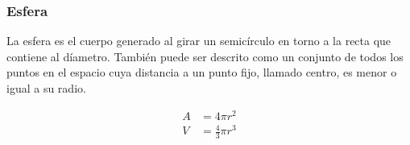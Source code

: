 \subsubsection{Esfera}
La esfera es el cuerpo generado al girar un semicírculo en torno a la recta que contiene al díametro. También puede ser descrito como un conjunto de todos los puntos en el espacio cuya distancia a un punto fijo, llamado centro, es menor o igual a su radio.

\begin{equation*}
    \begin{split} 
        A &= 4\pi r^2\\
        V &= \frac{4}{3} \pi r^3
    \end{split}
\end{equation*}